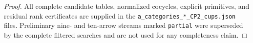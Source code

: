 \begin{proof}
All complete candidate tables, normalized cocycles, explicit primitives,
and residual rank certificates are supplied in the
\texttt{a\_categories\_*\_CP2\_cups.json} files. Preliminary
nine- and ten-arrow streams marked \texttt{partial} were superseded
by the complete filtered searches and are not used for any
completeness claim.
\end{proof}
